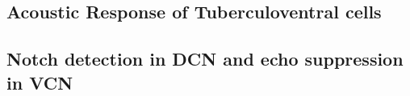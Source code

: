 \subsection{Acoustic Response of Tuberculoventral cells}

\subsection{Notch detection in DCN and echo suppression in VCN}





